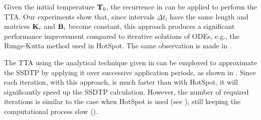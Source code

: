 \label{ap:tta-analytical}
Given the initial temperature $\mathbf{T}_0$, the recurrence in  can be applied to perform the TTA. Our experiments show that, since intervals $\Delta t_i$ have the same length and matrices $\mathbf{K}_i$ and $\mathbf{B}_i$ become constant, this approach produces a significant performance improvement compared to iterative solutions of ODEs, e.g., the Runge-Kutta method used in HotSpot. The same observation is made in \cite{thiele2011}.

The TTA using the analytical technique given in  can be employed to approximate the SSDTP by applying it over successive application periods, as shown in . Since each iteration, with this approach, is much faster than with HotSpot, it will significantly speed up the SSDTP calculation. However, the number of required iterations is similar to the case when HotSpot is used (see ), still keeping the computational process slow ().
